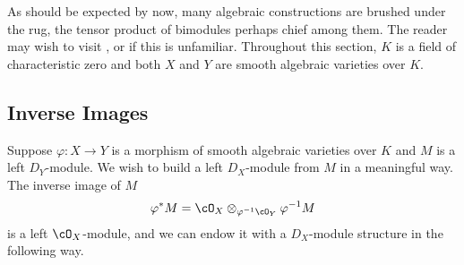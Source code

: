 As should be expected by now, many algebraic constructions are brushed under the rug, the tensor product of bimodules perhaps chief among them. The reader may wish to visit \cite{d-mod-primer}, \cite{d-mod_ps-rt} or \cite{ginzburg_d-mod} if this is unfamiliar. Throughout this section, $K$ is a field of characteristic zero and both $X$ and $Y$ are smooth algebraic varieties over $K$. 

\subsection{Inverse Images}
Suppose $\varphi:X\to Y$ is a morphism of smooth algebraic varieties over $K$ and $M$ is a left $D_Y$-module. We wish to build a left $D_X$-module from $M$ in a meaningful way. The inverse image of $M$
\begin{align*}
	\varphi^*M = \cO_X \otimes_{\varphi^{-1}\cO_Y} \varphi^{-1}M
\end{align*}
is a left $\cO_X$-module, and we can endow it with a $D_X$-module structure in the following way.

